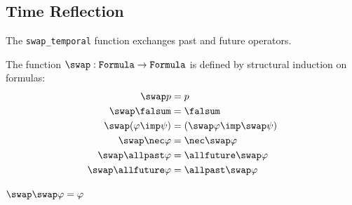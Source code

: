 \documentclass[../BimodalReference.tex]{subfiles}
\begin{document}
\subsection{Time Reflection}

The \texttt{swap\_temporal} function exchanges past and future operators.

\begin{definition}
The function $\swap : \texttt{Formula} \to \texttt{Formula}$ is defined by structural induction on formulas:
\begin{align*}
  \swap p &= p \\
  \swap \falsum &= \falsum \\
  \swap (\varphi \imp \psi) &= (\swap\varphi \imp \swap\psi) \\
  \swap \nec\varphi &= \nec\swap\varphi \\
  \swap \allpast\varphi &= \allfuture\swap\varphi \\
  \swap \allfuture\varphi &= \allpast\swap\varphi
\end{align*}
\end{definition}

\begin{theorem}[Involution]
$\swap\swap\varphi = \varphi$
\end{theorem}
\end{document}
